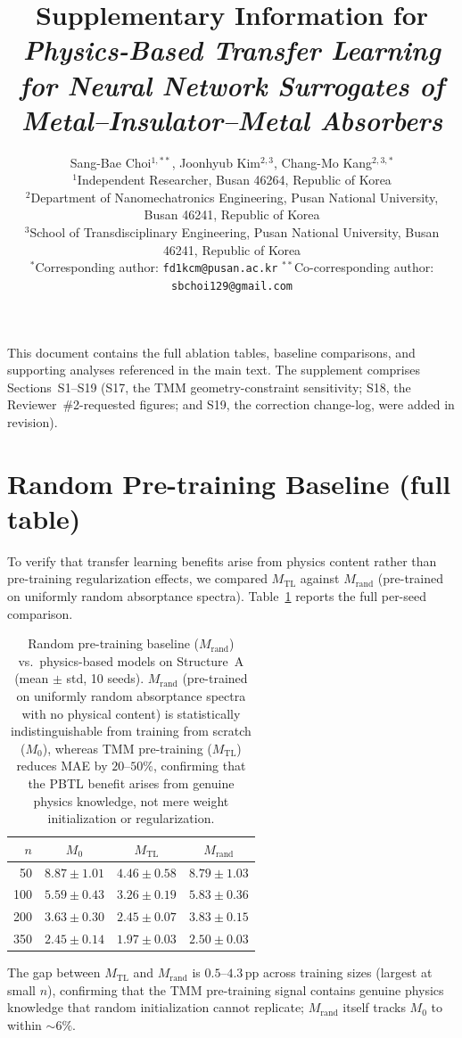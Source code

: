 \documentclass[11pt]{article}
\title{Supplementary Information for\\
\textit{Physics-Based Transfer Learning for Neural Network Surrogates of Metal--Insulator--Metal Absorbers}}
\author{Sang-Bae Choi$^{1,**}$, Joonhyub Kim$^{2,3}$, Chang-Mo Kang$^{2,3,*}$ \\[0.4em]
\small $^{1}$Independent Researcher, Busan 46264, Republic of Korea \\
\small $^{2}$Department of Nanomechatronics Engineering, Pusan National University, Busan 46241, Republic of Korea \\
\small $^{3}$School of Transdisciplinary Engineering, Pusan National University, Busan 46241, Republic of Korea \\[0.3em]
\small $^{*}$Corresponding author: \texttt{fd1kcm@pusan.ac.kr} \quad $^{**}$Co-corresponding author: \texttt{sbchoi129@gmail.com}}
\date{}
\newcommand{\Mzero}{\ensuremath{M_0}}
\newcommand{\Mtl}{\ensuremath{M_\text{TL}}}
\newcommand{\Mrand}{\ensuremath{M_\text{rand}}}
\begin{document}
\maketitle

\noindent
This document contains the full ablation tables, baseline comparisons, and supporting analyses referenced in the main text. The supplement comprises Sections~S1--S19 (S17, the TMM geometry-constraint sensitivity; S18, the Reviewer~\#2-requested figures; and S19, the correction change-log, were added in revision).

\section{Random Pre-training Baseline (full table)}
\label{sec:si_random}

To verify that transfer learning benefits arise from physics content rather than pre-training regularization effects, we compared $\Mtl$ against $\Mrand$ (pre-trained on uniformly random absorptance spectra). Table~\ref{tab:random} reports the full per-seed comparison.

\begin{table}[htbp]\centering\small
\caption{Random pre-training baseline ($\Mrand$) vs.\ physics-based models on Structure~A (mean $\pm$ std, 10 seeds). $\Mrand$ (pre-trained on uniformly random absorptance spectra with no physical content) is statistically indistinguishable from training from scratch ($\Mzero$), whereas TMM pre-training ($\Mtl$) reduces MAE by $20$--$50\%$, confirming that the PBTL benefit arises from genuine physics knowledge, not mere weight initialization or regularization.}
\label{tab:random}
\begin{tabular}{r ccc}\toprule
$n$ & $\Mzero$ & $\Mtl$ & $\Mrand$\\\midrule
50  & $8.87 \pm 1.01$ & $4.46 \pm 0.58$ & $8.79 \pm 1.03$\\
100 & $5.59 \pm 0.43$ & $3.26 \pm 0.19$ & $5.83 \pm 0.36$\\
200 & $3.63 \pm 0.30$ & $2.45 \pm 0.07$ & $3.83 \pm 0.15$\\
350 & $2.45 \pm 0.14$ & $1.97 \pm 0.03$ & $2.50 \pm 0.03$\\\bottomrule
\end{tabular}
\end{table}

The gap between $\Mtl$ and $\Mrand$ is $0.5$--$4.3$\,pp across training sizes (largest at small $n$), confirming that the TMM pre-training signal contains genuine physics knowledge that random initialization cannot replicate; $\Mrand$ itself tracks $\Mzero$ to within ${\sim}6\%$.
\end{document}
